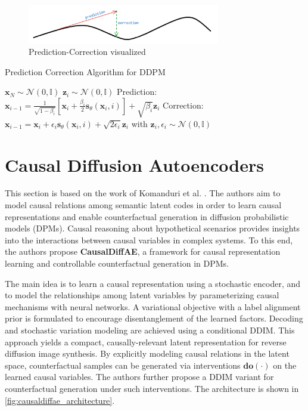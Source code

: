 \documentclass{article}
\newcommand{\x}{\mathbf{x}}
\newcommand{\N}{\mathcal{N}}
\begin{document}
	 \begin{figure}[H]
	 	\centering
	 	\includegraphics[width=0.75\textwidth]{images/prediction-correction}
	 	\caption{Prediction-Correction visualized}
	 	\label{fig:prediction_correction}
	 \end{figure}
	
	 \begin{algorithm}[H]
	 \caption{Prediction Correction Algorithm for DDPM \cite{song2021}}
	 \begin{algorithmic}[1]
	 	\State $\x_N \sim \N (0, \mathbb{I})$
	 		\State $\boldsymbol{z}_i \sim \N(0, \mathbb{I})$
		 	\State Prediction: $\displaystyle \x_{i-1} = \frac{1}{\sqrt{1 - \beta_i}} \left[ \x_i + \frac{\beta_i}{2} \boldsymbol{s}_\theta (\x_i, i) \right] + \sqrt{\beta_i} \boldsymbol{z}_i$ 
		 		\State Correction: $\x_{i-1} = \x_i + \epsilon_i \boldsymbol{s}_\theta (\x_i, i) + \sqrt{2 \epsilon_i} \boldsymbol{z}_i$ with $\boldsymbol{z}_i, \epsilon_i \sim \N(0, \mathbb{I})$
		 	\EndFor
	 	\EndFor
	 \end{algorithmic}
	 \end{algorithm}
	 
	 \section{Causal Diffusion Autoencoders}
	 
	 This section is based on the work of Komanduri et al. \cite{akomandu2024}. The authors aim to model causal relations among semantic latent codes in order to learn causal representations and enable counterfactual generation in diffusion probabilistic models (DPMs). Causal reasoning about hypothetical scenarios provides insights into the interactions between causal variables in complex systems. To this end, the authors propose \textbf{CausalDiffAE}, a framework for causal representation learning and controllable counterfactual generation in DPMs.
	 
	 The main idea is to learn a causal representation using a stochastic encoder, and to model the relationships among latent variables by parameterizing causal mechanisms with neural networks. A variational objective with a label alignment prior is formulated to encourage disentanglement of the learned factors. Decoding and stochastic variation modeling are achieved using a conditional DDIM. This approach yields a compact, causally-relevant latent representation for reverse diffusion image synthesis. By explicitly modeling causal relations in the latent space, counterfactual samples can be generated via interventions $\boldsymbol{do}(\cdot)$ on the learned causal variables. The authors further propose a DDIM variant for counterfactual generation under such interventions. The architecture is shown in \autoref{fig:causaldiffae_architecture}.
	 
\end{document}
